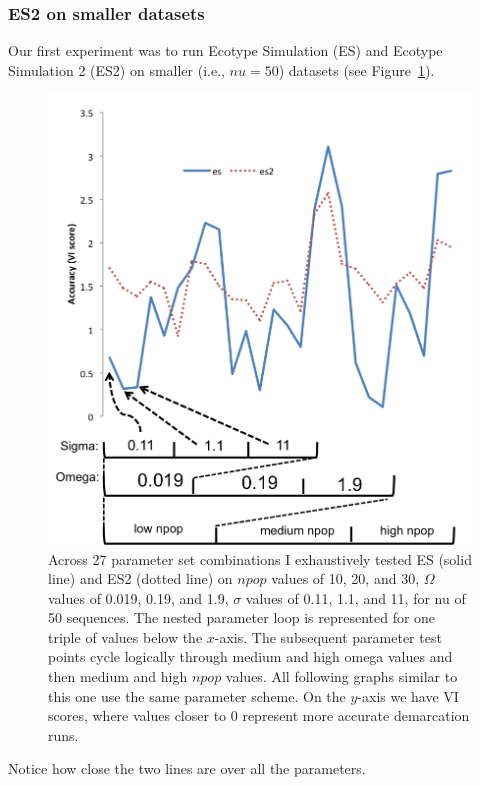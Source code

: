 \subsubsection*{ES2 on smaller datasets}
Our first experiment was to run Ecotype Simulation (ES) and Ecotype Simulation 2 (ES2) on smaller (i.e., $nu = 50$) datasets (see Figure~\ref{fig:ESvES2}).
\begin{figure}[h!]
  \centering
    \includegraphics[scale=0.75]{images/ResultGraphs/ResultGraphs-4}
      \caption[ES vs ES2 accuracy visualization on $nu = 50$.]{Across 27 parameter set combinations I exhaustively tested ES (solid line) and ES2 (dotted line) on $npop$ values of 10, 20, and 30, $\Omega$ values of 0.019, 0.19, and 1.9, $\sigma$ values of 0.11, 1.1, and 11, for nu of 50 sequences. The nested parameter loop is represented for one triple of values below the $x$-axis. The subsequent parameter test points cycle logically through medium and high omega values and then medium and high $npop$ values. All following graphs similar to this one use the same parameter scheme. On the $y$-axis we have VI scores, where values closer to 0 represent more accurate demarcation runs.}
    \label{fig:ESvES2}
\end{figure}
Notice how close the two lines are over all the parameters.
